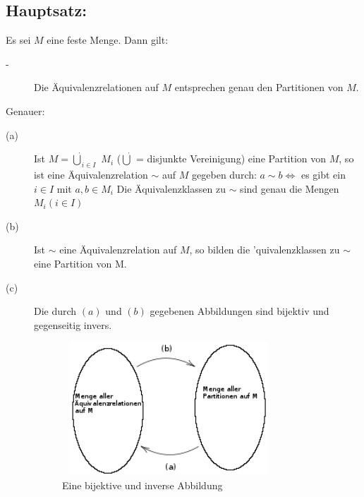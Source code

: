 \subsection{Hauptsatz:}
Es sei $M$ eine feste Menge. Dann gilt:
\begin{description}
	\item[-] Die Äquivalenzrelationen auf $M$ entsprechen genau den Partitionen von $M$.
\end{description}
Genauer:
\begin{description}
	\item[(a)] Ist $M = \dot{\bigcup}_{i \in I}$ $M_{i}$ ($\dot{\bigcup}$  = disjunkte Vereinigung) eine Partition von $M$, so ist eine Äquivalenzrelation $\sim$ auf $M$ gegeben durch: $a \sim b \Leftrightarrow$ es gibt ein $i \in I$ mit $a,b \in M_{i}$ Die Äquivalenzklassen zu $\sim$ sind genau die Mengen $M_{i} (i \in I)$
	\item[(b)] Ist $\sim$ eine Äquivalenzrelation auf $M$, so bilden die 'quivalenzklassen zu $\sim$ eine Partition von M.
	\item[(c)] Die durch $(a)$ und $(b)$ gegebenen Abbildungen sind bijektiv und gegenseitig invers. 
		\begin{figure} [H]
		\centering 
		\includegraphics[width=8cm, height=5cm]{mainmatter/chapter1/pics/bijektivinvers.png}
		\caption{Eine bijektive und inverse Abbildung} 
		\end{figure}
\end{description}
%
%
%
